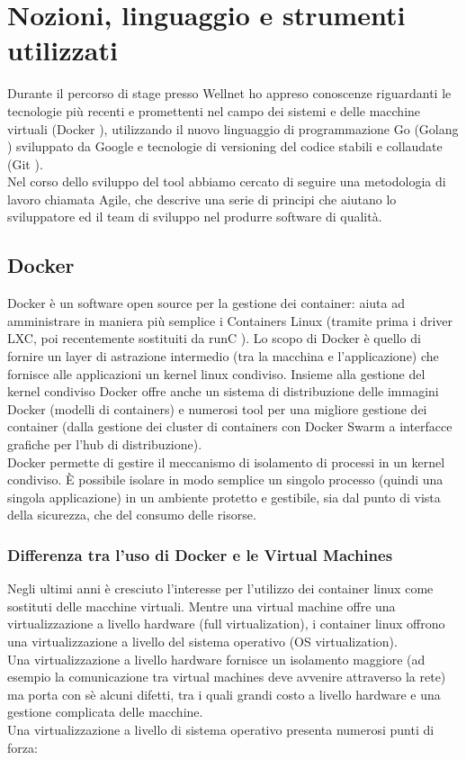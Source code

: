\chapter{Nozioni, linguaggio e strumenti utilizzati}
Durante il percorso di stage presso Wellnet ho appreso conoscenze riguardanti
le tecnologie più recenti e promettenti nel campo dei sistemi e delle
macchine virtuali (Docker \cite{docker-website}), utilizzando il nuovo linguaggio di programmazione
Go (Golang \cite{go-website}) sviluppato da Google e tecnologie di versioning del codice stabili
e collaudate (Git \cite{git-website}).
\\
Nel corso dello sviluppo del tool abbiamo cercato di seguire una metodologia di
lavoro chiamata Agile, che descrive una serie di principi che aiutano lo sviluppatore
ed il team di sviluppo nel produrre software di qualità.

\section{Docker}
Docker \cite{docker-website} è un software open source per la gestione dei container:
 aiuta ad amministrare in maniera più semplice i Containers Linux (tramite
 prima i driver LXC, poi recentemente sostituiti da runC \cite{runC-website}).
Lo scopo di Docker è quello di fornire un layer di astrazione intermedio (tra
la macchina e l'applicazione) che fornisce alle applicazioni un kernel
linux condiviso.
Insieme alla gestione del kernel condiviso Docker offre anche un sistema di
distribuzione delle immagini Docker (modelli di containers) e numerosi tool
per una migliore gestione dei container (dalla gestione dei cluster di containers
con Docker Swarm a interfacce grafiche per l'hub di distribuzione).
\\
Docker permette di gestire il meccanismo di isolamento di processi in un kernel
condiviso. È possibile isolare in modo semplice un singolo processo (quindi
una singola applicazione) in un ambiente protetto e gestibile, sia dal punto
di vista della sicurezza, che del consumo delle risorse.

\subsection{Differenza tra l’uso di Docker e le Virtual Machines}
Negli ultimi anni è cresciuto l'interesse per l'utilizzo dei container
linux come sostituti delle macchine virtuali.
Mentre una virtual machine offre una virtualizzazione a livello hardware
(full virtualization), i container linux offrono una virtualizzazione a livello
del sistema operativo (OS virtualization).
\\[2\baselineskip]
Una virtualizzazione a livello hardware fornisce un isolamento maggiore (ad esempio
la comunicazione tra virtual machines deve avvenire attraverso la rete) ma
porta con sè alcuni difetti, tra i quali grandi costo a livello hardware e
una gestione complicata delle macchine\cite{dockerAndContainers-slides}.\\
Una virtualizzazione a livello di sistema operativo presenta numerosi punti di forza:

